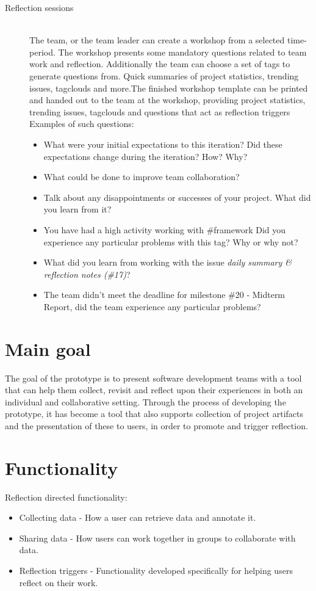 \begin{description}
	\item[Reflection sessions] \hfill \\
	The team, or the team leader can create a workshop from a selected time-period. The workshop presents some mandatory questions
	related to team work and reflection. Additionally the team can choose a set of tags to generate questions from. Quick summaries of project statistics, trending issues, tagclouds and more.The finished workshop template can be printed and
	handed out to the team at the workshop, providing project statistics, trending issues, tagclouds and questions that act as reflection triggers\\
	Examples of such questions: 
		\begin{itemize}
			\item What were your initial expectations to this iteration? Did these expectations change during the iteration? How? Why?
			\item What could be done to improve team collaboration?
			\item Talk about any disappointments or successes of your project. What did you learn from it?
			\item You have had a high activity working with \#framework Did you experience any particular problems with this tag? Why or why not?
			\item What did you learn from working with the issue \textit{daily summary \& reflection notes (\#17)}?
			\item The team didn't meet the deadline for milestone \#20 - Midterm Report, did the team experience any particular problems?
		\end{itemize}
\end{description}

\section{Main goal}
The goal of the prototype is to present software development teams with a tool that can help them collect, revisit and reflect upon their experiences in both an individual and collaborative setting. Through the process of developing the prototype, it has become a tool that also supports collection of project artifacts and the presentation of these to users, in order to promote and trigger reflection. 

\section{Functionality}
Reflection directed functionality:
\begin{itemize}
\item Collecting data - How a user can retrieve data and annotate it. 
\item Sharing data - How users can work together in groups to collaborate with data. 
\item Reflection triggers - Functionality developed specifically for helping users reflect on their work.
\end{itemize}

